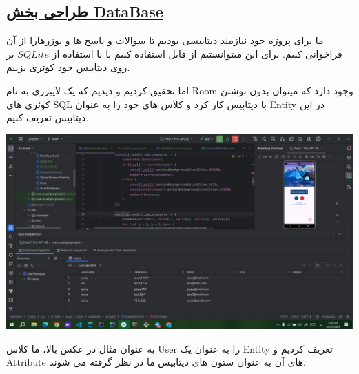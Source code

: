 \subsection*{\underline{طراحی بخش DataBase}}

ما برای پروژه خود نیازمند دیتابیسی بودیم تا سوالات و پاسخ ها و یوزرهارا از آن فراخوانی کنیم.
برای این میتوانستیم از فایل استفاده کنیم یا با استفاده از $SQLite$ بر روی دیتابیس خود کوئری بزنیم.

اما تحقیق کردیم و دیدیم که یک لایبرری به نام Room وجود دارد که میتوان بدون نوشتن کوئری های SQL با دیتابیس کار کرد و کلاس های خود را به عنوان Entity در این دیتابیس تعریف کنیم.


	\includegraphics[width=1\linewidth]{screenshot004}

به عنوان مثال در عکس بالا، ما کلاس User را به عنوان یک Entity تعریف کردیم و Attribute های آن به عنوان ستون های دیتابیس ما در نظر گرفته می شوند.
